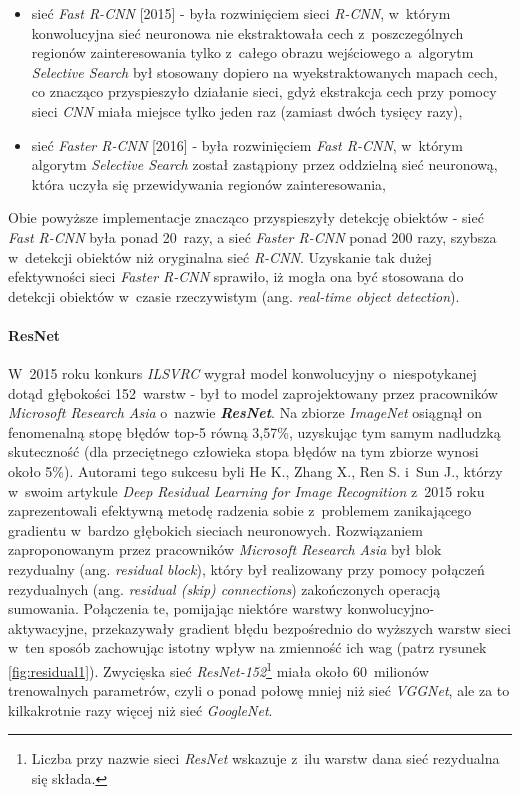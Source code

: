 \begin{itemize}
\item sieć \emph{Fast R-CNN} [2015] - była rozwinięciem sieci \emph{R-CNN}, w~którym konwolucyjna sieć neuronowa nie ekstraktowała cech z~poszczególnych regionów zainteresowania tylko z~całego obrazu wejściowego a~algorytm \emph{Selective Search} był stosowany dopiero na wyekstraktowanych mapach cech, co znacząco przyspieszyło działanie sieci, gdyż ekstrakcja cech przy pomocy sieci \emph{CNN} miała miejsce tylko jeden raz (zamiast dwóch tysięcy razy),
\item sieć \emph{Faster R-CNN} [2016] - była rozwinięciem \emph{Fast R-CNN}, w~którym  algorytm \emph{Selective Search} został zastąpiony przez oddzielną sieć neuronową, która uczyła się przewidywania regionów zainteresowania,
\end{itemize}

Obie powyższe implementacje znacząco przyspieszyły detekcję obiektów - sieć \emph{Fast R-CNN} była ponad 20~razy, a sieć \emph{Faster R-CNN} ponad 200 razy, szybsza w~detekcji obiektów niż oryginalna sieć \emph{R-CNN}.  Uzyskanie tak dużej efektywności sieci \emph{Faster R-CNN} sprawiło, iż mogła ona być stosowana do detekcji obiektów w~czasie rzeczywistym (ang. \emph{real-time object detection}).

\paragraph*{ResNet}

W~2015 roku konkurs \emph{ILSVRC} wygrał model konwolucyjny o~niespotykanej dotąd głębokości 152~warstw - był to model zaprojektowany przez pracowników \emph{Microsoft Research Asia} o~nazwie \textbf{\emph{ResNet}}. Na zbiorze \emph{ImageNet} osiągnął on fenomenalną stopę błędów top-5 równą 3,57\%, uzyskując tym samym nadludzką skuteczność (dla przeciętnego człowieka stopa błędów na tym zbiorze wynosi około 5\%). Autorami tego sukcesu byli He K., Zhang X., Ren S. i~Sun J., którzy w~swoim artykule \emph{Deep Residual Learning for Image Recognition} z~2015 roku \cite{he} zaprezentowali efektywną metodę radzenia sobie z~problemem zanikającego gradientu w~bardzo głębokich sieciach neuronowych. Rozwiązaniem zaproponowanym przez pracowników \emph{Microsoft Research Asia} był blok rezydualny (ang. \emph{residual block}), który był realizowany przy pomocy połączeń rezydualnych (ang. \emph{residual (skip) connections}) zakończonych operacją sumowania. Połączenia te, pomijając niektóre warstwy konwolucyjno-aktywacyjne, przekazywały gradient błędu bezpośrednio do wyższych warstw sieci w~ten sposób zachowując istotny wpływ na zmienność ich wag (patrz rysunek \ref{fig:residual1}). Zwycięska sieć \emph{ResNet-152}\footnote{Liczba przy nazwie sieci \emph{ResNet} wskazuje z~ilu warstw dana sieć rezydualna się składa.} miała około 60~milionów trenowalnych parametrów, czyli o ponad połowę mniej niż sieć \emph{VGGNet}, ale za to kilkakrotnie razy więcej niż sieć \emph{GoogleNet}.

